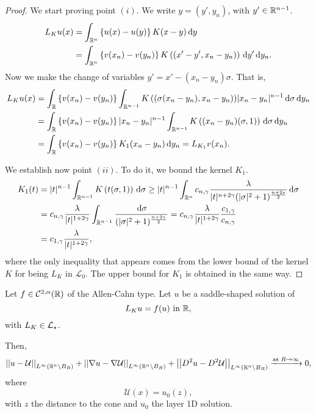 \begin{proof}
	We start proving point $(i)$. We write $y=(y',y_n)$, with $y'\in \mathbb{R}^{n-1}$.
	\begin{align*}
	L_K u(x) &= \int_{\mathbb{R}^n} \left\{ u(x)-u(y) \right\} K(x-y) \,\mathrm{d} y \\
	&=\int_{\mathbb{R}^n} \left\{ v(x_n)-v(y_n) \right\} K\left((x'-y',x_n-y_n)\right) \,\mathrm{d} y' \,\mathrm{d} y_n.
	\end{align*}
	Now we make the change of variables $y' = x'-(x_n-y_n)\sigma$. That is,
	\begin{align*}
	L_K u(x) &= \int_{\mathbb{R}} \left\{ v(x_n)-v(y_n) \right\} \int_{\mathbb{R}^{n-1}} K\left((\sigma(x_n-y_n),x_n-y_n\right)) |x_n-y_n|^{n-1} \,\mathrm{d} \sigma \,\mathrm{d} y_n \\
	&= \int_{\mathbb{R}} \left\{ v(x_n)-v(y_n) \right\} |x_n-y_n|^{n-1} \int_{\mathbb{R}^{n-1}} K\left((x_n-y_n)(\sigma,1)\right) \,\mathrm{d}\sigma \,\mathrm{d} y_n \\
	&= \int_{\mathbb{R}} \left\{ v(x_n)-v(y_n) \right\} K_1(x_n-y_n ) \,\mathrm{d} y_n = L_{K_1}v(x_n). \\
	\end{align*}
	
	We establish now point $(ii)$. To do it, we bound the kernel $K_1$. 
	\begin{align*}
	K_1(t) &= |t|^{n-1} \int_{\mathbb{R}^{n-1}} K\left(t(\sigma,1)\right) \,\mathrm{d}\sigma \geq |t|^{n-1} \int_{\mathbb{R}^n} c_{n,\gamma} \frac{\lambda}{|t|^{n+2\gamma}(|\sigma|^2+1)^{\frac{n+2s}{2}}} \,\mathrm{d}\sigma \\
	&= c_{n,\gamma} \frac{\lambda}{|t|^{1+2\gamma}} \int_{\mathbb{R}^{n-1}} \frac{\,\mathrm{d}\sigma}{(|\sigma|^2+1)^{\frac{n+2\gamma}{2}}} = c_{n,\gamma} \frac{\lambda}{|t|^{1+2\gamma}} \frac{c_{1,\gamma}}{c_{n,\gamma}} \\
	&= c_{1,\gamma} \frac{\lambda}{|t|^{1+2\gamma}},
	\end{align*}
	where the only inequality that appears comes from the lower bound of the kernel $K$ for being $L_K $ in $\mathcal{L}_0$. The upper bound for $K_1$ is obtained in the same way.
\end{proof}







\begin{theorem}
\label{Thm:AsymptoticBehaviourSaddleSolution}
Let $f\in \mathcal{C}^{2,\alpha}(\mathbb{R})$ of the Allen-Cahn type. Let $u$ be a saddle-shaped solution of
$$
L_K u = f(u) \ \textrm{in } \mathbb{R},
$$
with $L_K \in \mathcal{L}_\star$.

Then,
$$
\left | \left |{u-\mathcal{U}} \right | \right |_{L^\infty(\mathbb{R}^n\setminus B_R)}+\left | \left |{\nabla u-\nabla \mathcal{U}} \right | \right |_{L^\infty(\mathbb{R}^n\setminus B_R)}+\left | \left |{D^2u-D^2\mathcal{U}} \right | \right |_{L^\infty(\mathbb{R}^n\setminus B_R)} \xrightarrow{\text{as } R\to \infty}{} 0,
$$
where
$$
\mathcal{U}(x) = u_0(z),
$$
with $z$ the distance to the cone and $u_0$ the layer 1D solution.
\end{theorem}


